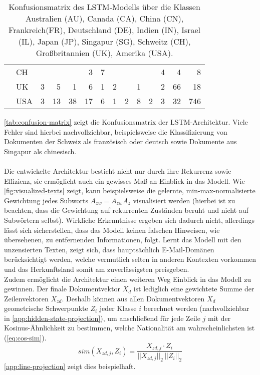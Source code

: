 \documentclass[bachelor,german]{info1thesis}
\begin{document}
\begin{table}[]
\begin{tabular}{@{}clrrrrrrrrrrrr@{}}
                           & CH  &    &    &    & 3   & 7  &    &    &    &    & 4  & 4  & 8   \\
                           & UK  & 3  & 5  & 1   & 6  & 1  & 2  &    & 1  &    & 2  & 66 & 18  \\
                           & USA & 3  & 13 & 38  & 17 & 6  & 1  & 2  & 8  & 2  & 3  & 32 & 746 \\ \cmidrule(l){2-14} 
\end{tabular}
\caption{Konfusionsmatrix des LSTM-Modells über die Klassen Australien (AU), Canada (CA), China (CN), Frankreich(FR), Deutschland (DE), Indien (IN), Israel (IL), Japan (JP), Singapur (SG), Schweitz (CH), Großbritannien (UK), Amerika (USA).}
\label{tab:confusion-matrix}
\end{table}
%
\noindent\autoref{tab:confusion-matrix} zeigt die Konfusionsmatrix der LSTM-Architektur. Viele Fehler sind hierbei nachvollziehbar, beispielsweise die Klassifizierung von Dokumenten der Schweiz als französisch oder deutsch sowie Dokumente aus Singapur als chinesisch. \\ \\
Die entwickelte Architektur besticht nicht nur durch ihre Rekurrenz sowie Effizienz, sie ermöglicht auch ein gewisses Maß an Einblick in das Modell. Wie \autoref{fig:visualized-texts} zeigt, kann beispielsweise die gelernte, min-max-normalisierte Gewichtung jedes Subworts $A_{zw} = A_{zw}A_{z}$ visualisiert werden (hierbei ist zu beachten, dass die Gewichtung auf rekurrenten Zuständen beruht und nicht auf Subwörtern selbst). Wirkliche Erkenntnisse ergeben sich dadurch nicht, allerdings lässt sich sicherstellen, dass das Modell keinen falschen Hinweisen, wie übersehenen, zu entfernenden Informationen, folgt. Lernt das Modell mit den unzensierten Texten, zeigt sich, dass hauptsächlich E-Mail-Domänen berücksichtigt werden, welche vermutlich selten in anderen Kontexten vorkommen und das Herkunftsland somit am zuverlässigsten preisgeben. \\
%
%
%
%
Zudem ermöglicht die Architektur einen weiteren Weg Einblick in das Modell zu gewinnen. Der finale Dokumentvektor $X_d$ ist lediglich eine gewichtete Summe der Zeilenvektoren $X_{zd}$. Deshalb können aus allen Dokumentvektoren $X_d$ geometrische Schwerpunkte $Z_i$ jeder Klasse $i$ berechnet werden (nachvollziehbar in \autoref{app:hidden-state-projection}), um anschließend für jede Zeile $j$ mit der Kosinus-Ähnlichkeit zu bestimmen, welche Nationalität am wahrscheinlichsten ist (\autoref{eq:cos-sim}).
\begin{equation}
sim(X_{zd,j}, Z_i) = \frac{X_{zd,j} \cdot Z_i}{||X_{zd,j}||_2\,||Z_i||_2} \label{eq:cos-sim}
\end{equation}
\autoref{app:line-projection} zeigt dies beispielhaft.
\end{document}
